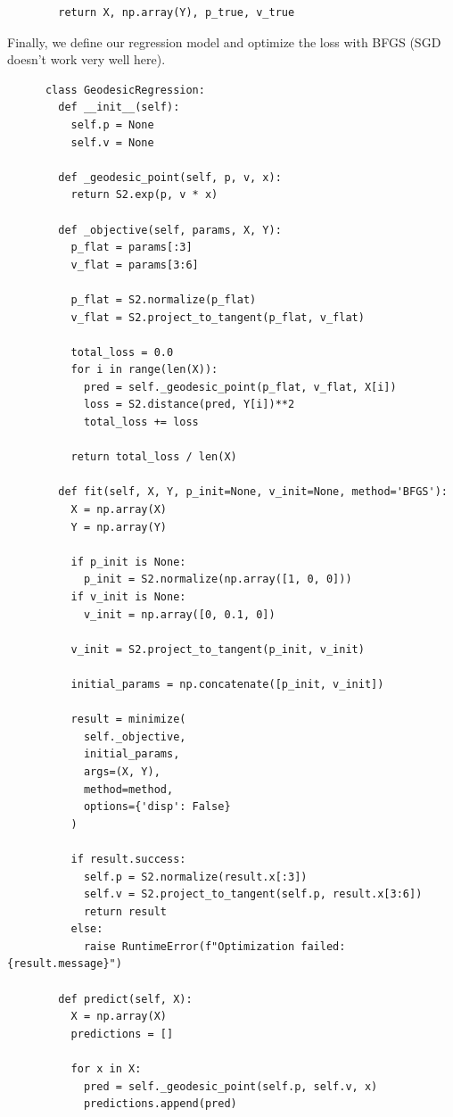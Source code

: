 \begin{example}
\begin{lstlisting}
        return X, np.array(Y), p_true, v_true
    \end{lstlisting}

    Finally, we define our regression model and optimize the loss with BFGS (SGD doesn't work very well here). 

    \begin{lstlisting}
      class GeodesicRegression:
        def __init__(self):
          self.p = None
          self.v = None
        
        def _geodesic_point(self, p, v, x):
          return S2.exp(p, v * x)
        
        def _objective(self, params, X, Y):
          p_flat = params[:3]
          v_flat = params[3:6]
          
          p_flat = S2.normalize(p_flat)
          v_flat = S2.project_to_tangent(p_flat, v_flat)
          
          total_loss = 0.0
          for i in range(len(X)):
            pred = self._geodesic_point(p_flat, v_flat, X[i])
            loss = S2.distance(pred, Y[i])**2
            total_loss += loss
          
          return total_loss / len(X)
        
        def fit(self, X, Y, p_init=None, v_init=None, method='BFGS'):
          X = np.array(X)
          Y = np.array(Y)
          
          if p_init is None:
            p_init = S2.normalize(np.array([1, 0, 0]))
          if v_init is None:
            v_init = np.array([0, 0.1, 0])
          
          v_init = S2.project_to_tangent(p_init, v_init)
          
          initial_params = np.concatenate([p_init, v_init])
          
          result = minimize(
            self._objective,
            initial_params,
            args=(X, Y),
            method=method,
            options={'disp': False}
          )
          
          if result.success:
            self.p = S2.normalize(result.x[:3])
            self.v = S2.project_to_tangent(self.p, result.x[3:6])
            return result
          else:
            raise RuntimeError(f"Optimization failed: {result.message}")
        
        def predict(self, X):
          X = np.array(X)
          predictions = []
          
          for x in X:
            pred = self._geodesic_point(self.p, self.v, x)
            predictions.append(pred)
          

\end{lstlisting}
\end{example}
